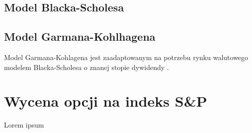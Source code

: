 \documentclass{pracamgr}
\begin{document}
\section{Model Blacka-Scholesa}

\section{Model Garmana-Kohlhagena}

Model Garmana-Kohlagena jest zaadaptowanym na potrzebu rynku walutowego modelem
Blacka-Scholesa o znanej stopie dywidendy . 


\chapter{Wycena opcji na indeks S\&P}\label{r:sp}
Lorem ipsum
 
\end{document}
